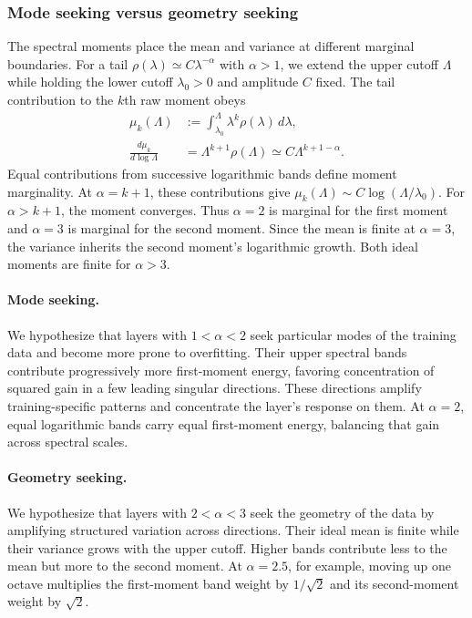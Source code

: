 \subsubsection{Mode seeking versus geometry seeking}
\label{sxn:mean_variance_marginality}
The spectral moments place the mean and variance at different
marginal boundaries. For a tail
$\rho(\lambda)\simeq C\lambda^{-\alpha}$ with $\alpha>1$,
we extend the upper cutoff $\Lambda$ while holding the lower cutoff
$\lambda_0>0$ and amplitude $C$ fixed. The tail contribution to the
$k$th raw moment obeys
\[
\begin{aligned}
 \mu_k(\Lambda)&:=\int_{\lambda_0}^{\Lambda}
                  \lambda^k\rho(\lambda)\,d\lambda,\\
 \frac{d\mu_k}{d\log\Lambda}
   &=\Lambda^{k+1}\rho(\Lambda)
     \simeq C\Lambda^{k+1-\alpha}.
\end{aligned}
\]
Equal contributions from successive logarithmic bands define
moment marginality. At $\alpha=k+1$, these contributions give
$\mu_k(\Lambda)\sim C\log(\Lambda/\lambda_0)$.
For $\alpha>k+1$, the moment converges. Thus $\alpha=2$ is marginal for the first moment and
$\alpha=3$ is marginal for the second moment. Since the mean is
finite at $\alpha=3$, the variance inherits the second moment's
logarithmic growth.
Both ideal moments are finite for $\alpha>3$.

\paragraph{Mode seeking.}
We hypothesize that layers with $1<\alpha<2$ seek particular
modes of the training data and become more prone to overfitting.
Their upper spectral bands contribute progressively more
first-moment energy, favoring concentration of squared gain in a
few leading singular directions. These
directions amplify training-specific patterns and concentrate the
layer's response on them. At $\alpha=2$, equal logarithmic bands
carry equal first-moment energy, balancing that gain across
spectral scales.

\paragraph{Geometry seeking.}
We hypothesize that layers with $2<\alpha<3$ seek the geometry of
the data by amplifying structured variation across directions.
Their ideal mean is finite while their variance grows with the
upper cutoff. Higher bands contribute less to
the mean but more to the second moment. At $\alpha=2.5$, for
example, moving up one octave multiplies the first-moment band
weight by $1/\sqrt{2}$ and its second-moment weight by $\sqrt{2}$.

